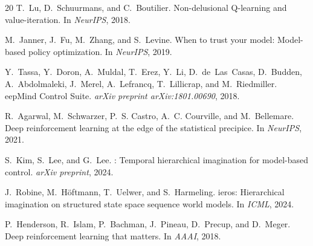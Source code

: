 \documentclass[10pt,letterpaper]{article}
\begin{document}
\begin{thebibliography}{20}
T.~Lu, D.~Schuurmans, and C.~Boutilier.
\newblock Non-delusional {Q}-learning and value-iteration.
\newblock In \emph{NeurIPS}, 2018.

M.~Janner, J.~Fu, M.~Zhang, and S.~Levine.
\newblock When to trust your model: Model-based policy optimization.
\newblock In \emph{NeurIPS}, 2019.

Y.~Tassa, Y.~Doron, A.~Muldal, T.~Erez, Y.~Li, D.~de~Las~Casas, D.~Budden, A.~Abdolmaleki, J.~Merel, A.~Lefrancq, T.~Lillicrap, and M.~Riedmiller.
eep{M}ind {C}ontrol {S}uite.
\newblock \emph{arXiv preprint arXiv:1801.00690}, 2018.

R.~Agarwal, M.~Schwarzer, P.~S. Castro, A.~C. Courville, and M.~Bellemare.
\newblock Deep reinforcement learning at the edge of the statistical precipice.
\newblock In \emph{NeurIPS}, 2021.

S.~Kim, S.~Lee, and G.~Lee.
: Temporal hierarchical imagination for model-based control.
\newblock \emph{arXiv preprint}, 2024.

J.~Robine, M.~H{\"o}ftmann, T.~Uelwer, and S.~Harmeling.
ieros: Hierarchical imagination on structured state space sequence world models.
\newblock In \emph{ICML}, 2024.

P.~Henderson, R.~Islam, P.~Bachman, J.~Pineau, D.~Precup, and D.~Meger.
\newblock Deep reinforcement learning that matters.
\newblock In \emph{AAAI}, 2018.

\end{thebibliography}
\end{document}
